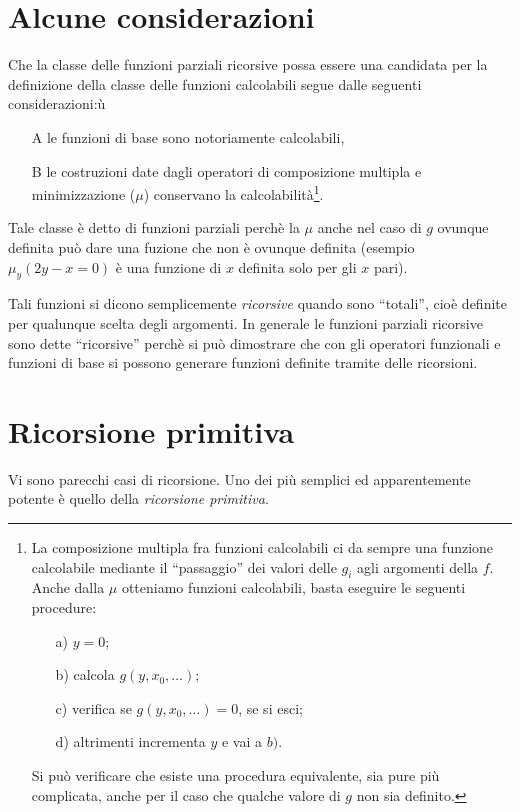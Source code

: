 \documentclass{book}
\begin{document}
\section{Alcune considerazioni}
Che la classe delle funzioni parziali ricorsive possa essere una candidata
per la definizione della classe delle funzioni calcolabili segue dalle seguenti
considerazioni:ù
\begin{enumerate}
  \item[A]le funzioni di base sono notoriamente calcolabili,
  \item[B]le costruzioni date dagli operatori di composizione multipla e 
 minimizzazione ($\mu$) conservano la calcolabilit\`a\footnote{La composizione 
    multipla fra funzioni calcolabili ci da sempre una funzione calcolabile 
    mediante il ``passaggio'' dei valori delle $g_i$ agli argomenti della $f$. 
    Anche dalla $\mu$ otteniamo funzioni calcolabili, basta eseguire le 
    seguenti procedure:
    \begin{enumerate}
    \item[a)]$y = 0$;
    \item[b)]calcola $g(y, x_0,\ldots )$;
    \item[c)]verifica se $g(y, x_0,\ldots ) = 0$, se si esci;
    \item[d)]altrimenti incrementa $y$ e vai a $b)$.
    \end{enumerate}
    Si pu\`o verificare che esiste una procedura equivalente, sia pure pi\`u
    complicata, anche per il caso che qualche valore di $g$ non sia definito.}.
\end{enumerate}
Tale classe \`e detto di funzioni parziali perch\`e la $\mu$ anche nel caso di
$g$ ovunque definita pu\`o dare una fuzione che non \`e ovunque definita 
(esempio $\mu_y(2y - x = 0)$ \`e una funzione di $x$ definita solo per gli $x$ 
pari).

Tali funzioni si dicono semplicemente \emph{ricorsive} quando sono ``totali'', 
cio\`e definite per qualunque scelta degli argomenti.
In generale le funzioni parziali ricorsive sono dette ``ricorsive'' perch\`e si
pu\`o dimostrare che con gli operatori funzionali e funzioni di base si possono
generare funzioni definite tramite delle ricorsioni.

\section{Ricorsione primitiva}
Vi sono parecchi casi di ricorsione. Uno dei pi\`u semplici ed apparentemente
potente \`e quello della \emph{ricorsione primitiva}.
\end{document}
